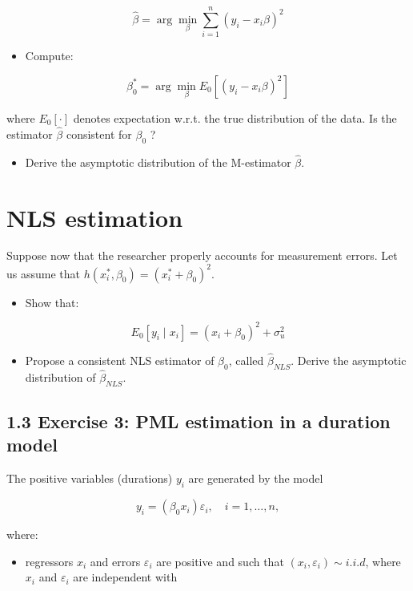 $$
\hat{\beta}=\arg \min _{\beta} \sum_{i=1}^{n}\left(y_{i}-x_{i} \beta\right)^{2}
$$

\begin{itemize}
  \item Compute:
\end{itemize}

$$
\beta_{0}^{*}=\arg \min _{\beta} E_{0}\left[\left(y_{i}-x_{i} \beta\right)^{2}\right]
$$

where $E_{0}[\cdot]$ denotes expectation w.r.t. the true distribution of the data. Is the estimator $\hat{\beta}$ consistent for $\beta_{0}$ ?

\begin{itemize}
  \item Derive the asymptotic distribution of the M-estimator $\hat{\beta}$.
\end{itemize}

\section{NLS estimation}
Suppose now that the researcher properly accounts for measurement errors. Let us assume that $h\left(x_{i}^{*}, \beta_{0}\right)=\left(x_{i}^{*}+\beta_{0}\right)^{2}$.

\begin{itemize}
  \item Show that:
\end{itemize}

$$
E_{0}\left[y_{i} \mid x_{i}\right]=\left(x_{i}+\beta_{0}\right)^{2}+\sigma_{u}^{2}
$$

\begin{itemize}
  \item Propose a consistent NLS estimator of $\beta_{0}$, called $\hat{\beta}_{N L S}$. Derive the asymptotic distribution of $\hat{\beta}_{N L S}$.
\end{itemize}

\subsection*{1.3 Exercise 3: PML estimation in a duration model}
The positive variables (durations) $y_{i}$ are generated by the model

$$
y_{i}=\left(\beta_{0} x_{i}\right) \varepsilon_{i}, \quad i=1, \ldots, n,
$$

where:

\begin{itemize}
  \item regressors $x_{i}$ and errors $\varepsilon_{i}$ are positive and such that $\left(x_{i}, \varepsilon_{i}\right) \sim i . i . d$, where $x_{i}$ and $\varepsilon_{i}$ are independent with
\end{itemize}

